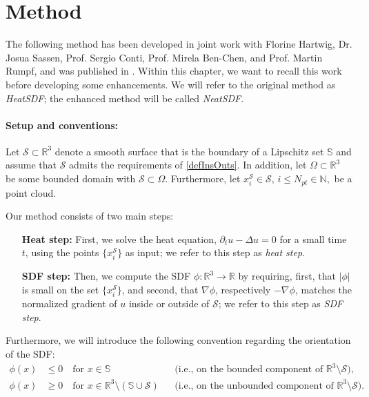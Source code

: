 \documentclass[12pt,openany]{book}
\newcommand{\R}{\mathbb{R}}
\def\S{\mathcal{S}}
\theoremstyle{plainnormal}
\theoremstyle{remark}
\begin{document}
\section{Method}\label{section_SDFmethod}
The following method has been developed in joint work with Florine Hartwig, Dr. Josua Sassen, Prof. Sergio Conti, Prof. Mirela Ben-Chen, and Prof. Martin Rumpf, and was published in \cite{weidemaier2025sdfsunorientedpointclouds}. Within this chapter, we want to recall this work before developing some enhancements. We will refer to the original method as \emph{HeatSDF}; the enhanced method will be called \emph{NeatSDF}.
\paragraph{Setup and conventions:}
Let \(\mathcal{S} \subset \mathbb{R}^3\) denote a smooth surface that is the boundary of a Lipschitz set \(\mathbb{S} \) and assume that $\S$ admits the requirements of \cref{defInsOuts}. In addition, let $\Omega \subset \R^3$ be some bounded domain with $\S \subset \Omega$.
Furthermore, let $x^\S_i\in \mathcal{S}, \, i \leq N_{pt}\in \mathbb N,$ be a point cloud.\par
Our method consists of two main steps:
\begin{enumerate}[align=left]
\item[\textbf{Heat step:}]First, we solve the heat equation, $\partial_t u - \Delta u = 0$ for a small time $t$, using the points $\{x^\S_i\}$ as input; we refer to this step as \emph{heat step}.
\item[\textbf{SDF step:}] Then, we compute the SDF $\phi: \mathbb{R}^3\rightarrow\R$ by requiring, first, that $|\phi|$ is small on the set $\{x_i^\mathcal{S}\}$, and second, that $\nabla \phi$, respectively $-\nabla \phi$, matches the normalized gradient of $u$ inside or outside of $\mathcal{S}$; we refer to this step as \emph{SDF step}.
\end{enumerate}

Furthermore, we will introduce the following convention regarding the orientation of the SDF:
\begin{align*}
\phi(x) &\leq 0 \quad \text{for } x \in \mathbb S \, \,\, &&\text{(i.e., on the bounded component of }\R^3\setminus\mathcal{S}), \\ \phi(x) &\geq 0 \quad \text{for } x \in \mathbb{R}^3 \setminus (\mathbb{S} \cup \mathcal S)  &&\text{(i.e., on the unbounded component of }\R^3\setminus\mathcal{S}).   
\end{align*}
\end{document}
